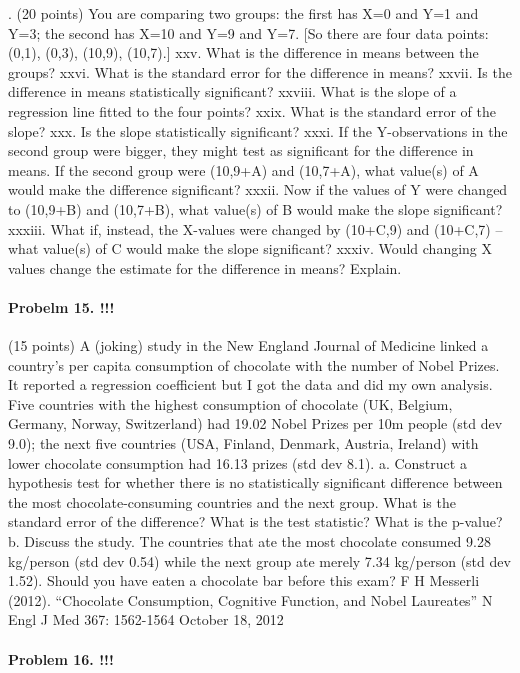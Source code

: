 \documentclass[]{article}
\let\oldparagraph\paragraph
\renewcommand{\paragraph}[1]{\oldparagraph{#1}\mbox{}}
\begin{document}
. (20 points) You are comparing two groups: the first has X=0 and Y=1
and Y=3; the second has X=10 and Y=9 and Y=7. {[}So there are four data
points: (0,1), (0,3), (10,9), (10,7).{]} xxv. What is the difference in
means between the groups? xxvi. What is the standard error for the
difference in means? xxvii. Is the difference in means statistically
significant? xxviii. What is the slope of a regression line fitted to
the four points? xxix. What is the standard error of the slope? xxx. Is
the slope statistically significant? xxxi. If the Y-observations in the
second group were bigger, they might test as significant for the
difference in means. If the second group were (10,9+A) and (10,7+A),
what value(s) of A would make the difference significant? xxxii. Now if
the values of Y were changed to (10,9+B) and (10,7+B), what value(s) of
B would make the slope significant? xxxiii. What if, instead, the
X-values were changed by (10+C,9) and (10+C,7) -- what value(s) of C
would make the slope significant? xxxiv. Would changing X values change
the estimate for the difference in means? Explain.

\paragraph{Probelm 15. !!!}\label{probelm-15.}

(15 points) A (joking) study in the New England Journal of Medicine
linked a country's per capita consumption of chocolate with the number
of Nobel Prizes. It reported a regression coefficient but I got the data
and did my own analysis. Five countries with the highest consumption of
chocolate (UK, Belgium, Germany, Norway, Switzerland) had 19.02 Nobel
Prizes per 10m people (std dev 9.0); the next five countries (USA,
Finland, Denmark, Austria, Ireland) with lower chocolate consumption had
16.13 prizes (std dev 8.1). a. Construct a hypothesis test for whether
there is no statistically significant difference between the most
chocolate-consuming countries and the next group. What is the standard
error of the difference? What is the test statistic? What is the
p-value? b. Discuss the study. The countries that ate the most chocolate
consumed 9.28 kg/person (std dev 0.54) while the next group ate merely
7.34 kg/person (std dev 1.52). Should you have eaten a chocolate bar
before this exam? F H Messerli (2012). ``Chocolate Consumption,
Cognitive Function, and Nobel Laureates'' N Engl J Med 367: 1562-1564
October 18, 2012

\paragraph{Problem 16. !!!}\label{problem-16.}
\end{document}
